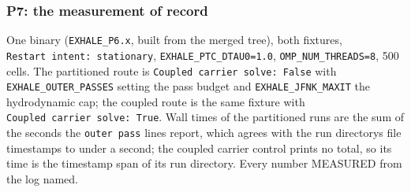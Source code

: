 \documentclass[english,a4paper]{my_memo}
\begin{document}
\subsubsection{P7: the measurement of record}\label{p7-the-measurement-of-record}

One binary (\texttt{EXHALE\_P6.x}, built from the merged tree), both fixtures,
\texttt{Restart\ intent:\ stationary}, \texttt{EXHALE\_PTC\_DTAU0=1.0}, \texttt{OMP\_NUM\_THREADS=8},
500 cells. The partitioned route is \texttt{Coupled\ carrier\ solve:\ False} with
\texttt{EXHALE\_OUTER\_PASSES} setting the pass budget and \texttt{EXHALE\_JFNK\_MAXIT} the
hydrodynamic cap; the coupled route is the same fixture with \texttt{Coupled\ carrier\ solve:\ True}. Wall times of the partitioned runs are the sum of the seconds
the \texttt{outer\ pass} lines report, which agrees with the run directory\textquotesingle s file
timestamps to under a second; the coupled carrier control prints no total, so
its time is the timestamp span of its run directory. Every number MEASURED
from the log named.
\end{document}
